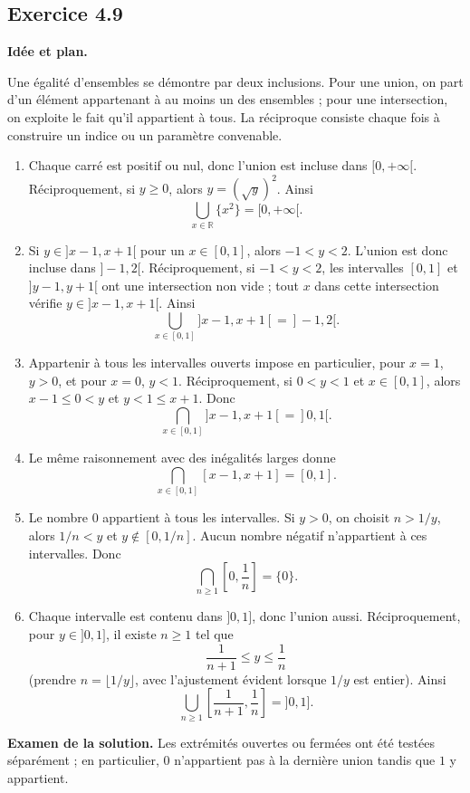 \documentclass[11pt,a4paper]{article}
\newcommand{\R}{\mathbb R}
\newcommand{\1}{\mathbf 1}
\newenvironment{corrige}[1]{%
  \Needspace{5\baselineskip}%
  \subsection*{Exercice #1}%
  \addcontentsline{toc}{subsection}{Exercice #1}%
}{\medskip}
\newenvironment{methode}{%
  \begin{center}\begin{minipage}{0.94\linewidth}
  \color{MATblue}\textbf{Idée et plan.}\enspace
}{%
  \end{minipage}\end{center}
}
\begin{document}
\begin{corrige}{4.9}
\begin{methode}
Une égalité d'ensembles se démontre par deux inclusions. Pour une union, on part d'un élément appartenant à au moins un des ensembles ; pour une intersection, on exploite le fait qu'il appartient à tous. La réciproque consiste chaque fois à construire un indice ou un paramètre convenable.
\end{methode}
\begin{enumerate}
  \item Chaque carré est positif ou nul, donc l'union est incluse dans $[0,+\infty[$. Réciproquement, si $y\geq0$, alors $y=(\sqrt y)^2$. Ainsi
  \[
  \boxed{\bigcup_{x\in\R}\{x^2\}=[0,+\infty[}.
  \]

  \item Si $y\in]x-1,x+1[$ pour un $x\in[0,1]$, alors $-1<y<2$. L'union est donc incluse dans $]-1,2[$. Réciproquement, si $-1<y<2$, les intervalles $[0,1]$ et $]y-1,y+1[$ ont une intersection non vide ; tout $x$ dans cette intersection vérifie $y\in]x-1,x+1[$. Ainsi
  \[
  \boxed{\bigcup_{x\in[0,1]}]x-1,x+1[=]-1,2[}.
  \]

  \item Appartenir à tous les intervalles ouverts impose en particulier, pour $x=1$, $y>0$, et pour $x=0$, $y<1$. Réciproquement, si $0<y<1$ et $x\in[0,1]$, alors $x-1\leq0<y$ et $y<1\leq x+1$. Donc
  \[
  \boxed{\bigcap_{x\in[0,1]}]x-1,x+1[=]0,1[}.
  \]

  \item Le même raisonnement avec des inégalités larges donne
  \[
  \boxed{\bigcap_{x\in[0,1]}[x-1,x+1]=[0,1]}.
  \]

  \item Le nombre $0$ appartient à tous les intervalles. Si $y>0$, on choisit $n>1/y$, alors $1/n<y$ et $y\notin[0,1/n]$. Aucun nombre négatif n'appartient à ces intervalles. Donc
  \[
  \boxed{\bigcap_{n\geq1}\left[0,\frac1n\right]=\{0\}}.
  \]

  \item Chaque intervalle est contenu dans $]0,1]$, donc l'union aussi. Réciproquement, pour $y\in]0,1]$, il existe $n\geq1$ tel que
  \[
  \frac1{n+1}\leq y\leq\frac1n
  \]
  (prendre $n=\lfloor1/y\rfloor$, avec l'ajustement évident lorsque $1/y$ est entier). Ainsi
  \[
  \boxed{\bigcup_{n\geq1}\left[\frac1{n+1},\frac1n\right]=]0,1]}.
  \]
\end{enumerate}
\textbf{Examen de la solution.} Les extrémités ouvertes ou fermées ont été testées séparément ; en particulier, $0$ n'appartient pas à la dernière union tandis que $1$ y appartient.
\end{corrige}
\end{document}
